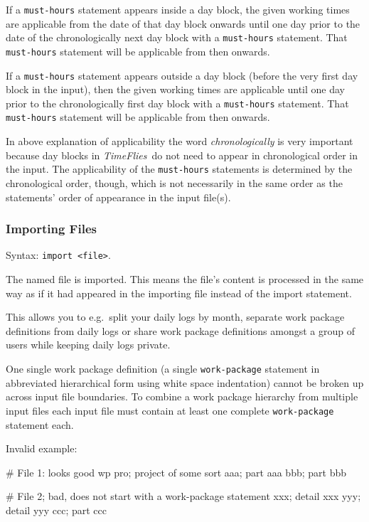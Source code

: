 \documentclass[11pt]{article}
\newcommand{\timeflies}{\emph{TimeFlies}}
\begin{document}
If a \verb:must-hours: statement appears inside a day block, the given working times are applicable from the date of that day block onwards until one day prior to the date of the chronologically next day block with a \verb:must-hours: statement. That \verb:must-hours: statement will be applicable from then onwards.

If a \verb:must-hours: statement appears outside a day block (before the very first day block in the input), then the given working times are applicable until one day prior to the chronologically first day block with a \verb:must-hours: statement. That \verb:must-hours: statement will be applicable from then onwards.

In above explanation of applicability the word \emph{chronologically} is very important because day blocks in \timeflies\ do not need to appear in chronological order in the input. The applicability of the \verb:must-hours: statements is determined by the chronological order, though, which is not necessarily in the same order as the statements' order of appearance in the input file(s).

\subsubsection{Importing Files}

Syntax: \verb:import <file>:.

The named file is imported. This means the file's content is processed in the same way as if it had appeared in the importing file instead of the import statement.

This allows you to e.g.\ split your daily logs by month, separate work package definitions from daily logs or share work package definitions amongst a group of users while keeping daily logs private.

One single work package definition (a single \verb:work-package: statement in abbreviated hierarchical form using white space indentation) cannot be broken up across input file boundaries. To combine a work package hierarchy from multiple input files each input file must contain at least one complete \verb:work-package: statement each.

Invalid example:

\begin{inputfile}
# File 1: looks good
wp pro; project of some sort
    aaa; part aaa
    bbb; part bbb
\end{inputfile}

\begin{inputfile}
# File 2; bad, does not start with a work-package statement
        xxx; detail xxx
        yyy; detail yyy
    ccc; part ccc
\end{inputfile}
\end{document}
